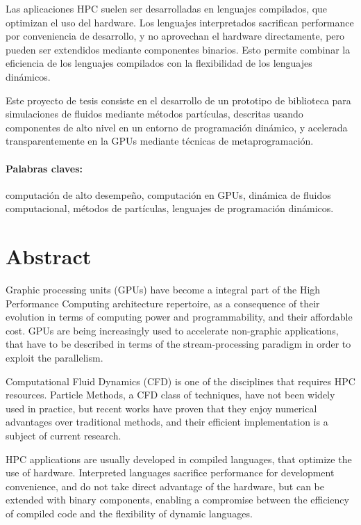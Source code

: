 \documentclass[11pt,spanish]{article}
\begin{document}
Las aplicaciones HPC suelen ser desarrolladas en lenguajes compilados, que
optimizan el uso del hardware.  Los lenguajes interpretados sacrifican
performance por conveniencia de desarrollo, y no aprovechan el hardware
directamente, pero pueden ser extendidos mediante componentes binarios.  Esto
permite combinar la eficiencia de los lenguajes compilados con la flexibilidad
de los lenguajes dinámicos.

Este proyecto de tesis consiste en el desarrollo de un prototipo de biblioteca
para simulaciones de fluidos mediante métodos partículas, descritas usando
componentes de alto nivel en un entorno de programación dinámico, y acelerada
transparentemente en la GPUs mediante técnicas de metaprogramación.

\paragraph{Palabras claves:}
computación de alto desempeño,
computación en GPUs,
dinámica de fluidos computacional,
métodos de partículas,
lenguajes de programación dinámicos.


\section*{Abstract}
Graphic processing units (GPUs) have become a integral part
of the High Performance Computing architecture repertoire, as a consequence of
their evolution in terms of computing power and programmability, and their
affordable cost.  GPUs are being increasingly used to accelerate non-graphic
applications, that have to be described in terms of the stream-processing
paradigm in order to exploit the parallelism.

Computational Fluid Dynamics (CFD) is one of the disciplines that requires HPC
resources.  Particle Methods, a CFD class of techniques, have not been widely
used in practice, but recent works have proven that they enjoy numerical
advantages over traditional methods, and their efficient implementation is a
subject of current research.

HPC applications are usually developed in compiled languages, that optimize the
use of hardware.  Interpreted languages sacrifice performance for development
convenience, and do not take direct advantage of the hardware, but can be
extended with binary components, enabling a compromise between the efficiency of
compiled code and the flexibility of dynamic languages.
\end{document}
